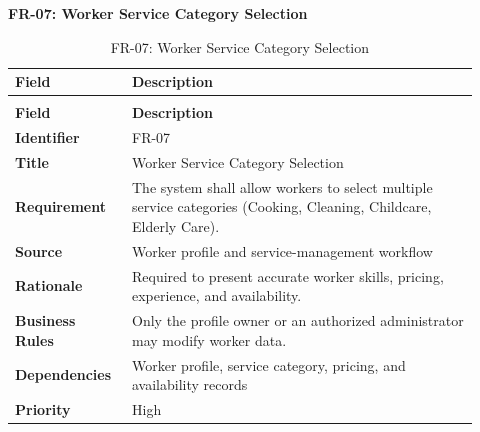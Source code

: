 \documentclass[12pt,a4paper]{article}
\begin{document}
\noindent\textbf{FR-07: Worker Service Category Selection}\par
\vspace{4pt}
\begingroup\small\setlength{\tabcolsep}{4pt}\renewcommand{\arraystretch}{1.15}
\begin{longtable}{|>{\raggedright\arraybackslash}p{0.22\linewidth}|>{\raggedright\arraybackslash}p{0.70\linewidth}|}
\caption{FR-07: Worker Service Category Selection}\label{tab:fr-07}\\
\hline
\textbf{Field} & \textbf{Description} \\ \hline
\endfirsthead
\multicolumn{2}{c}{Table \thetable\ Worker Service Category Selection (continued)}\\
\hline
\textbf{Field} & \textbf{Description} \\ \hline
\endhead
\textbf{Identifier} & FR-07 \\ \hline
\textbf{Title} & Worker Service Category Selection \\ \hline
\textbf{Requirement} & The system shall allow workers to select multiple service categories (Cooking, Cleaning, Childcare, Elderly Care). \\ \hline
\textbf{Source} & Worker profile and service-management workflow \\ \hline
\textbf{Rationale} & Required to present accurate worker skills, pricing, experience, and availability. \\ \hline
\textbf{Business Rules} & Only the profile owner or an authorized administrator may modify worker data. \\ \hline
\textbf{Dependencies} & Worker profile, service category, pricing, and availability records \\ \hline
\textbf{Priority} & High \\ \hline
\end{longtable}
\endgroup
\end{document}
